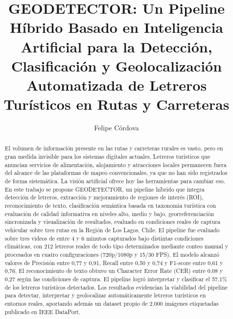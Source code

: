 \documentclass[runningheads]{llncs}
\begin{document}



\title{GEODETECTOR: Un Pipeline Híbrido Basado en Inteligencia 
Artificial para la Detección, Clasificación y Geolocalización Automatizada de
 Letreros Turísticos en Rutas y Carreteras}
%
%
\author{Felipe Córdova}
%
%

%
\maketitle              %
%

\begin{abstract}
El volumen de información presente en las rutas y carreteras rurales es vasto,
pero en gran medida invisible para los sistemas digitales actuales. Letreros
turísticos que anuncian servicios de alimentación, alojamiento y atracciones
locales permanecen fuera del alcance de las plataformas de mapeo convencionales,
ya que no han sido registrados de forma sistemática. La visión artificial
ofrece hoy las herramientas para cambiar eso. En este trabajo se propone 
GEODETECTOR, un pipeline híbrido que integra detección de letreros, 
extracción y mejoramiento de regiones de interés (ROI), reconocimiento 
de texto, clasificación semántica basada en taxonomía turística con 
evaluación de calidad informativa en niveles alto, medio y bajo, 
georreferenciación sincronizada y visualización de resultados, evaluado en condiciones reales de 
captura vehicular sobre tres rutas en la Región de Los Lagos, Chile. El 
pipeline fue evaluado sobre tres videos de entre 4 y 6 minutos capturados
bajo distintas condiciones climáticas, con 212 letreros reales de todo 
tipo determinados mediante conteo manual y procesados en cuatro configuraciones
(720p/1080p y 15/30 FPS). El modelo alcanzó valores de Precisión entre 0,77 y 0,91, 
Recall entre 0,50 y 0,74 y F1-score entre 0,61 y 0,76. El reconocimiento
de texto obtuvo un Character Error Rate (CER) entre 0,08 y 0,27 según las 
condiciones de captura. El pipeline logró interpretar y clasificar el
57,1\% de los letreros turísticos detectados. Los resultados evidencian la viabilidad del pipeline 
para detectar, interpretar y geolocalizar automáticamente letreros turísticos
en entornos reales, aportando además un dataset propio de 2.000 imágenes
etiquetadas publicado en IEEE DataPort.
\end{abstract}
\end{document}
